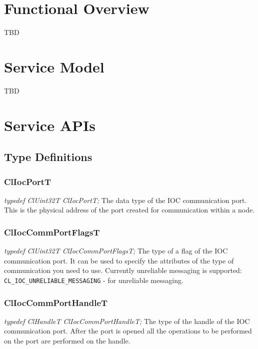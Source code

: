 \hypertarget{group__group25}{
\label{group__group25}
}

\begin{flushleft}

\chapter{Functional Overview}
TBD

\chapter{Service Model}
TBD


\chapter{Service APIs}

\section{Type Definitions}

\subsection{ClIocPortT}
\textit{typedef ClUint32T ClIocPortT;}
\newline
\newline
The data type of the IOC communication port. This is the physical address of the port created for communication within a node.



\subsection{ClIocCommPortFlagsT}
\textit{typedef ClUint32T ClIocCommPortFlagsT;}
\newline
\newline
 The type of a flag of the IOC communication port.
It can be used to specify the attributes of the type of communication you need to use.
 Currently unreliable messaging is supported:
 {\tt{CL\_\-IOC\_\-UNRELIABLE\_\-MESSAGING}} - for unreliable messaging.



\subsection{ClIocCommPortHandleT}
\textit{typedef ClHandleT ClIocCommPortHandleT;}
\newline
\newline
The type of the handle of the IOC communication port. After the port is opened all the operations to be performed on the port are performed on the handle.




\end{flushleft}
